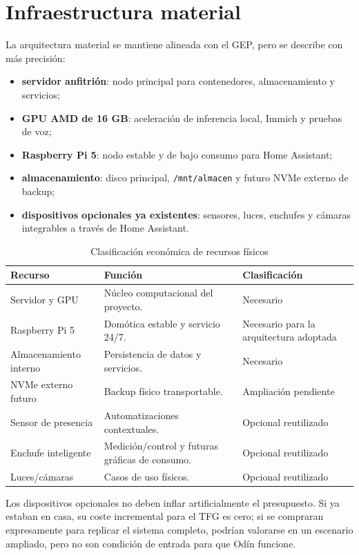 \section{Infraestructura material}
La arquitectura material se mantiene alineada con el GEP, pero se describe con más precisión:
\begin{itemize}
  \item \textbf{servidor anfitrión}: nodo principal para contenedores, almacenamiento y servicios;
  \item \textbf{GPU AMD de 16 GB}: aceleración de inferencia local, Immich y pruebas de voz;
  \item \textbf{Raspberry Pi 5}: nodo estable y de bajo consumo para Home Assistant;
  \item \textbf{almacenamiento}: disco principal, \nolinkurl{/mnt/almacen} y futuro NVMe externo de backup;
  \item \textbf{dispositivos opcionales ya existentes}: sensores, luces, enchufes y cámaras integrables a través de Home Assistant.
\end{itemize}

\begin{table}[H]
  \centering
  \caption{Clasificación económica de recursos físicos}
  \label{tab:clasificacion-recursos-fisicos}
  \begin{tabularx}{\textwidth}{lXl}
    \toprule
    Recurso & Función & Clasificación \\
    \midrule
    Servidor y GPU & Núcleo computacional del proyecto. & Necesario \\
    Raspberry Pi 5 & Domótica estable y servicio 24/7. & Necesario para la arquitectura adoptada \\
    Almacenamiento interno & Persistencia de datos y servicios. & Necesario \\
    NVMe externo futuro & Backup físico transportable. & Ampliación pendiente \\
    Sensor de presencia & Automatizaciones contextuales. & Opcional reutilizado \\
    Enchufe inteligente & Medición/control y futuras gráficas de consumo. & Opcional reutilizado \\
    Luces/cámaras & Casos de uso físicos. & Opcional reutilizado \\
    \bottomrule
  \end{tabularx}
\end{table}

Los dispositivos opcionales no deben inflar artificialmente el presupuesto. Si ya estaban en casa, su coste incremental para el TFG es cero; si se compraran expresamente para replicar el sistema completo, podrían valorarse en un escenario ampliado, pero no son condición de entrada para que Odín funcione.

